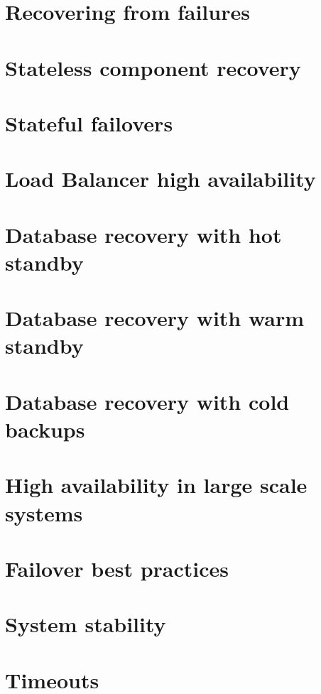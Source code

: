 \documentclass[11pt]{article}
\begin{document}
\section{Recovering from failures}

\section{Stateless component recovery}

\section{Stateful failovers}

\section{Load Balancer high availability}

\section{Database recovery with hot standby}

\section{Database recovery with warm standby}

\section{Database recovery with cold backups}

\section{High availability in large scale systems}

\section{Failover best practices}

\section{System stability}

\section{Timeouts}
\end{document}
